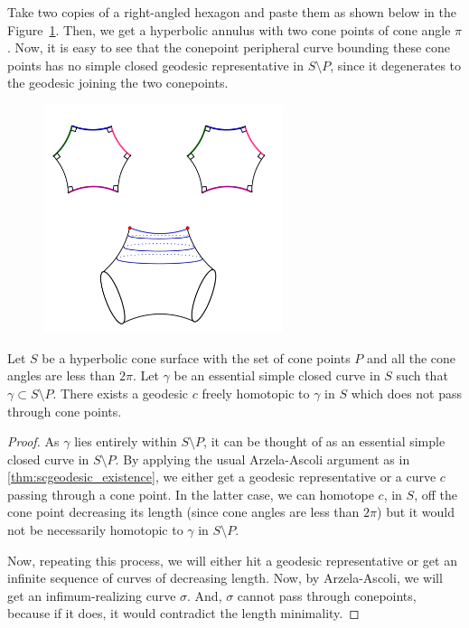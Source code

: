 \begin{exmp}
	Take two copies of a right-angled hexagon and paste them as shown below in the Figure~\ref{fig:rtangledhex}. Then, we get a hyperbolic annulus with two cone points of cone angle $\pi$. Now, it is easy to see that the conepoint peripheral curve bounding these cone points has no simple closed geodesic representative in $S \setminus P$, since it degenerates to the geodesic joining the two conepoints.
	
	\begin{figure}[h]
		\includegraphics[width=7cm]{Chapter1/rtangledhex.pdf}
		\caption{}
		\label{fig:rtangledhex}
	\end{figure}
\end{exmp}

\begin{theorem}\label{thm:scgeodesic_existence2}
	Let $S$ be a hyperbolic cone surface with the set of cone points $P$ and all the cone angles are less than $2\pi$. Let $\gamma$ be an essential simple closed curve in $S$ such that $\gamma \subset S \setminus P$. There exists a geodesic $c$ freely homotopic to $\gamma$ in $S$ which does not pass through cone points.
\end{theorem}
\begin{proof}
	As $\gamma$ lies entirely within $S \setminus P$, it can be thought of as an essential simple closed curve in $S \setminus P$. By applying the usual Arzela-Ascoli argument as in \ref{thm:scgeodesic_existence}, we either get a geodesic representative or a curve $c$ passing through a cone point. In the latter case, we can homotope $c$, in $S$, off the cone point decreasing its length (since cone angles are less than $2 \pi$) but it would not be necessarily homotopic to $\gamma$ in $S \setminus P$.
	
	Now, repeating this process, we will either hit a geodesic representative or get an infinite sequence of curves of decreasing length. Now, by Arzela-Ascoli, we will get an infimum-realizing curve $\sigma$. And, $\sigma$ cannot pass through conepoints, because if it does, it would contradict the length minimality. 
\end{proof}

